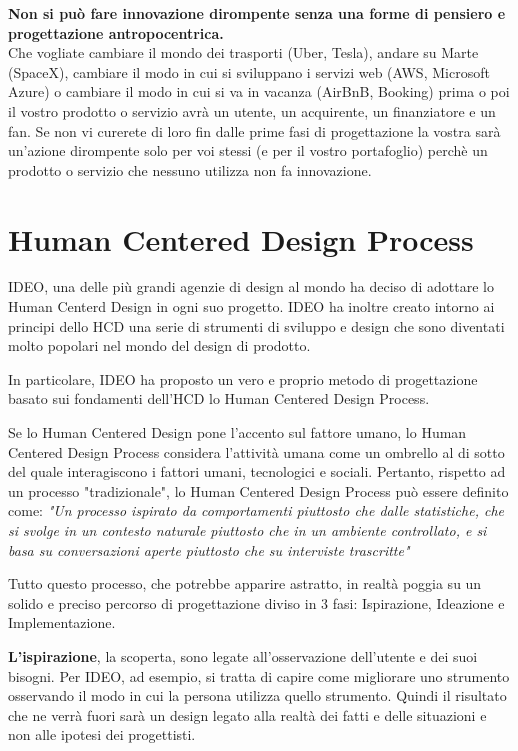 \textbf{Non si può fare innovazione dirompente senza una forme di pensiero e progettazione antropocentrica.}\\

Che vogliate cambiare il mondo dei trasporti (Uber, Tesla), andare su Marte (SpaceX), cambiare il modo in cui si sviluppano i servizi web (AWS, Microsoft Azure) o cambiare il modo in cui si va in vacanza (AirBnB, Booking) prima o poi il vostro prodotto o servizio avrà un utente, un acquirente, un finanziatore e un fan. Se non vi curerete di loro fin dalle prime fasi di progettazione la vostra sarà un'azione dirompente solo per voi stessi (e per il vostro portafoglio) perchè un prodotto o servizio che nessuno utilizza non fa innovazione.

\section{Human Centered Design Process}
IDEO, una delle più grandi agenzie di design al mondo ha deciso di adottare lo Human Centerd Design in ogni suo progetto. IDEO ha inoltre creato intorno ai principi dello HCD una serie di strumenti di sviluppo e design che sono diventati molto popolari nel mondo del design di prodotto.

In particolare, IDEO ha proposto un vero e proprio metodo di progettazione basato sui fondamenti dell'HCD lo Human Centered Design Process.

Se lo Human Centered Design pone l'accento sul fattore umano, lo Human Centered Design Process considera l'attività umana come un ombrello al di sotto del quale interagiscono i fattori umani, tecnologici e sociali.
Pertanto, rispetto ad un processo "tradizionale", lo Human Centered Design Process può essere definito come: \textit{"Un processo ispirato da comportamenti piuttosto che dalle statistiche, che si svolge in un contesto naturale piuttosto che in un ambiente controllato, e si basa su conversazioni aperte piuttosto che su interviste trascritte"}

Tutto questo processo, che potrebbe apparire astratto, in realtà poggia su un solido e preciso percorso di progettazione diviso in 3 fasi: Ispirazione, Ideazione e Implementazione.

\textbf{L'ispirazione}, la scoperta, sono legate all'osservazione dell'utente e dei suoi bisogni. Per IDEO, ad esempio, si tratta di capire come migliorare uno strumento osservando il modo in cui la persona utilizza quello strumento.  Quindi il risultato che ne verrà fuori sarà un design legato alla realtà dei fatti e delle situazioni e non alle ipotesi dei progettisti.


